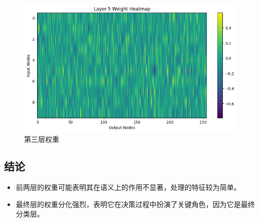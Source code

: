 \documentclass[a4paper,12pt]{article}
\begin{document}
\begin{figure}[H]
    \centering
    \includegraphics[width=1\textwidth]{layer3.png}
    \caption{第三层权重}
    \label{fig:example}
\end{figure}



\subsection{结论}
\begin{itemize}
    \item 前两层的权重可能表明其在语义上的作用不显著，处理的特征较为简单。
    \item 最终层的权重分化强烈，表明它在决策过程中扮演了关键角色，因为它是最终分类层。

\end{itemize}
\end{document}
